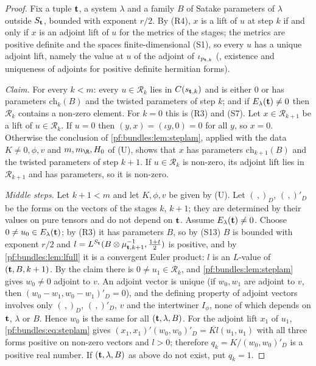\begin{proof}
Fix a tuple $\mathbf t$, a system $\lambda$ and a family $B$ of Satake parameters of $\lambda$ outside $S_\mathbf t$, bounded with exponent $r/2$. By
(R4), $x$ is a lift of $u$ at step $k$ if and only if $x$ is an adjoint lift of $u$ for the metrics of the stages; the metrics are positive
definite and the spaces finite-dimensional (S1), so every $u$ has a unique adjoint lift, namely the value at $u$ of the adjoint of
$\iota_{p_{\mathbf t,k}}$ (, existence and uniqueness of adjoints for positive definite
hermitian forms).

\emph{Claim.} For every $k<m$: every $u\in\mathcal R_k$ lies in $C(s_{\mathbf t,k})$ and is either $0$ or has parameters $\mathrm{ch}_k(B)$ and the
twisted parameters of step $k$; and if $E_\lambda(\mathbf t)\ne0$ then $\mathcal R_k$ contains a non-zero element. For $k=0$ this is (R3) and (S7).
Let $x\in\mathcal R_{k+1}$ be a lift of $u\in\mathcal R_k$. If $u=0$ then $(y,x)=(\iota y,0)=0$ for all $y$, so $x=0$. Otherwise the
conclusion of \cref{pf:bundles:lem:steplam}, applied with the data $K\neq0,\phi,v$ and $m,m_\R,H_0$ of (U), shows that $x$ has parameters
$\mathrm{ch}_{k+1}(B)$ and the twisted parameters of step $k+1$. If $u\in\mathcal R_k$ is non-zero, its adjoint lift lies in $\mathcal R_{k+1}$
and has parameters, so it is non-zero.

\emph{Middle steps.} Let $k+1<m$ and let $K,\phi,v$ be given by (U). Let $(\,,)_D$, $(\,,)'_D$ be the forms on the vectors of the stages $k$,
$k+1$; they are determined by their values on pure tensors and do not depend on $\mathbf t$. Assume $E_\lambda(\mathbf t)\ne0$. Choose $0\ne u_0\in
E_\lambda(\mathbf t)$; by (R3) it has parameters $B$, so by (S13) $B$ is bounded with exponent $r/2$ and $l=L^{S_\mathbf t}(B\otimes\mu_{\mathbf t,k+1}^{-1},
\frac{1+t}2)$ is positive, and by \cref{pf:bundles:lem:lfull} it is a convergent Euler product: $l$ is an $L$-value of $(\mathbf t,B,k+1)$. By the
claim there is $0\ne u_1\in\mathcal R_k$, and \cref{pf:bundles:lem:steplam} gives $w_0\ne0$ adjoint to $v$. An adjoint vector is unique (if $w_0,w_1$
are adjoint to $v$, then $(w_0-w_1,w_0-w_1)'_D=0$), and the defining property of adjoint vectors involves only $(\,,)_D$, $(\,,)'_D$, $v$ and the
intertwiner $I_\phi$, none of which depends on $\mathbf t$, $\lambda$ or $B$. Hence $w_0$ is the same for all $(\mathbf t,\lambda,B)$. For the adjoint lift
$x_1$ of $u_1$, \eqref{pf:bundles:eq:steplam} gives $(x_1,x_1)'(w_0,w_0)'_D=\overline{Kl}(u_1,u_1)$ with all three forms positive on non-zero
vectors and $l>0$; therefore $q_k=K/(w_0,w_0)'_D$ is a positive real number. If $(\mathbf t,\lambda,B)$ as above do not exist, put $q_k=1$.


\end{proof}
